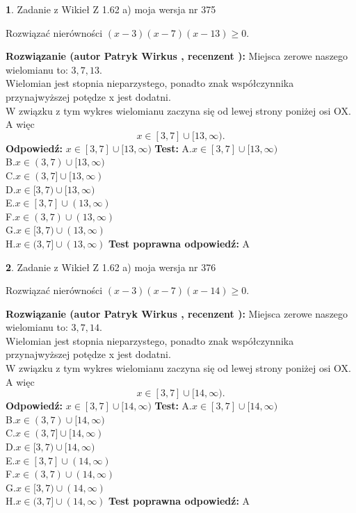 \documentclass[12pt, a4paper]{article}
\theoremstyle{definition} %
\newtheorem{zad}{}
\newcommand{\zadStart}[1]{\begin{zad}#1\newline}
\newcommand{\zadStop}{\end{zad}}
\newcommand{\rozwStart}[2]{\noindent \textbf{Rozwiązanie (autor #1 , recenzent #2): }\newline}
\newcommand{\rozwStop}{\newline}
\newcommand{\odpStart}{\noindent \textbf{Odpowiedź:}\newline}
\newcommand{\odpStop}{\newline}
\newcommand{\testStart}{\noindent \textbf{Test:}\newline}
\newcommand{\testStop}{\newline}
\newcommand{\kluczStart}{\noindent \textbf{Test poprawna odpowiedź:}\newline}
\newcommand{\kluczStop}{\newline}
\begin{document}
\zadStart{Zadanie z Wikieł Z 1.62 a) moja wersja nr 375}

Rozwiązać nierówności $(x-3)(x-7)(x-13)\ge0$.
\zadStop
\rozwStart{Patryk Wirkus}{}
Miejsca zerowe naszego wielomianu to: $3, 7, 13$.\\
Wielomian jest stopnia nieparzystego, ponadto znak współczynnika przy\linebreak najwyższej potędze x jest dodatni.\\ W związku z tym wykres wielomianu zaczyna się od lewej strony poniżej osi OX. A więc $$x \in [3,7] \cup [13,\infty).$$
\rozwStop
\odpStart
$x \in [3,7] \cup [13,\infty)$
\odpStop
\testStart
A.$x \in [3,7] \cup [13,\infty)$\\
B.$x \in (3,7) \cup [13,\infty)$\\
C.$x \in (3,7] \cup [13,\infty)$\\
D.$x \in [3,7) \cup [13,\infty)$\\
E.$x \in [3,7] \cup (13,\infty)$\\
F.$x \in (3,7) \cup (13,\infty)$\\
G.$x \in [3,7) \cup (13,\infty)$\\
H.$x \in (3,7] \cup (13,\infty)$
\testStop
\kluczStart
A
\kluczStop



\zadStart{Zadanie z Wikieł Z 1.62 a) moja wersja nr 376}

Rozwiązać nierówności $(x-3)(x-7)(x-14)\ge0$.
\zadStop
\rozwStart{Patryk Wirkus}{}
Miejsca zerowe naszego wielomianu to: $3, 7, 14$.\\
Wielomian jest stopnia nieparzystego, ponadto znak współczynnika przy\linebreak najwyższej potędze x jest dodatni.\\ W związku z tym wykres wielomianu zaczyna się od lewej strony poniżej osi OX. A więc $$x \in [3,7] \cup [14,\infty).$$
\rozwStop
\odpStart
$x \in [3,7] \cup [14,\infty)$
\odpStop
\testStart
A.$x \in [3,7] \cup [14,\infty)$\\
B.$x \in (3,7) \cup [14,\infty)$\\
C.$x \in (3,7] \cup [14,\infty)$\\
D.$x \in [3,7) \cup [14,\infty)$\\
E.$x \in [3,7] \cup (14,\infty)$\\
F.$x \in (3,7) \cup (14,\infty)$\\
G.$x \in [3,7) \cup (14,\infty)$\\
H.$x \in (3,7] \cup (14,\infty)$
\testStop
\kluczStart
A
\kluczStop
\end{document}
